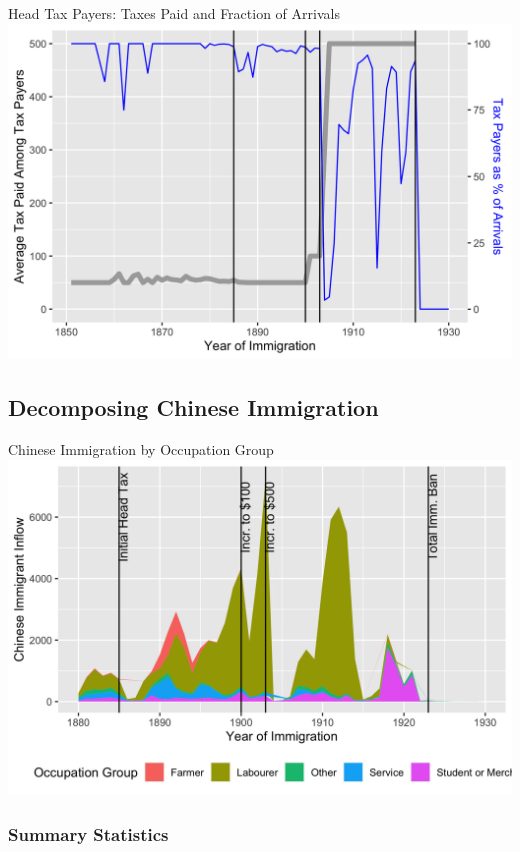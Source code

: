 \documentclass[pdf]{beamer}
\begin{document}
\begin{frame}{Head Tax Payers: Taxes Paid and Fraction of Arrivals}
    \includegraphics[width = \textwidth]{../../figs/taxbyyear.png}
\end{frame}

\subsection{Decomposing Chinese Immigration}
\begin{frame}{Chinese Immigration by Occupation Group}
    \includegraphics[width = \textwidth]{../../figs/chiocc.png}
\end{frame}

\appendix
\begin{frame}[label = summstats]
	\frametitle{Summary Statistics}
	\begin{table}[H]
        \centering 
		\resizebox{\textwidth}{!}{
            
		}
	\end{table}  
\end{frame}
\end{document}
